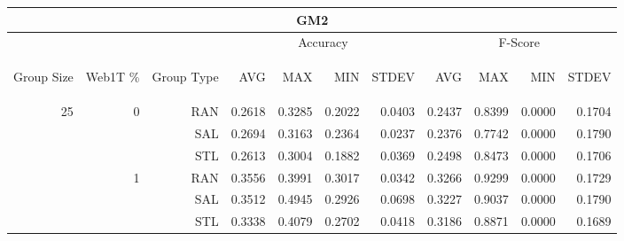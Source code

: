 \begin{center}
\begin{table}[htbp]
\begin{tabular}{ | r | r | r | r | r | r | r | r | r | r | r |}
\hline
\multicolumn{11}{|c|}{GM2}\\
\hline
 & & & \multicolumn{4}{|c|}{Accuracy} & \multicolumn{4}{|c|}{F-Score}\\ \cline{4-11}
\begin{sideways}Group Size\end{sideways} & \begin{sideways}Web1T \%\end{sideways} & \begin{sideways}Group Type\end{sideways} & \begin{sideways}AVG\end{sideways} & \begin{sideways}MAX\end{sideways} & \begin{sideways}MIN\end{sideways} & \begin{sideways}STDEV\end{sideways} & \begin{sideways}AVG\end{sideways} & \begin{sideways}MAX\end{sideways} & \begin{sideways}MIN\end{sideways} & \begin{sideways}STDEV\end{sideways}\\
\hline
\multirow{18}{*}{25}
 & \multirow{3}{*}{0} & RAN & 0.2618 & 0.3285 & 0.2022 & 0.0403 & 0.2437 & 0.8399 & 0.0000 & 0.1704\\ \cline{3-11}
 &   & SAL & 0.2694 & 0.3163 & 0.2364 & 0.0237 & 0.2376 & 0.7742 & 0.0000 & 0.1790\\ \cline{3-11}
 &   & STL & 0.2613 & 0.3004 & 0.1882 & 0.0369 & 0.2498 & 0.8473 & 0.0000 & 0.1706\\ \cline{2-11}
 & \multirow{3}{*}{1} & RAN & 0.3556 & 0.3991 & 0.3017 & 0.0342 & 0.3266 & 0.9299 & 0.0000 & 0.1729\\ \cline{3-11}
 &   & SAL & 0.3512 & 0.4945 & 0.2926 & 0.0698 & 0.3227 & 0.9037 & 0.0000 & 0.1790\\ \cline{3-11}
 &   & STL & 0.3338 & 0.4079 & 0.2702 & 0.0418 & 0.3186 & 0.8871 & 0.0000 & 0.1689\\ \cline{2-11}

\end{tabular}
\end{table}
\end{center}
